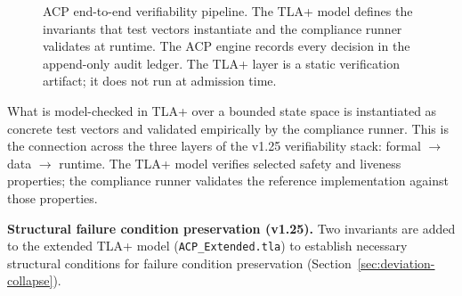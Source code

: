 \documentclass[11pt]{article}
\theoremstyle{definition}
\begin{document}
\begin{figure}[h!]
\centering
{}
\caption{ACP end-to-end verifiability pipeline.
  The TLA+ model defines the invariants that test vectors instantiate and the compliance runner validates at runtime.
  The ACP engine records every decision in the append-only audit ledger.
  The TLA+ layer is a static verification artifact; it does not run at admission time.}
\label{fig:acp-verifiability}
\end{figure}

\noindent What is model-checked in TLA+ over a bounded state space is instantiated
as concrete test vectors and validated empirically by the compliance runner.
This is the connection across the three layers of the v1.25 verifiability stack:
formal $\to$ data $\to$ runtime.
The TLA+ model verifies selected safety and liveness properties; the compliance
runner validates the reference implementation against those properties.

\textbf{Structural failure condition preservation (v1.25).}
Two invariants are added to the extended TLA+ model
(\texttt{ACP\_Extended.tla}) to establish necessary structural conditions for
failure condition preservation (Section~\ref{sec:deviation-collapse}).
\end{document}
